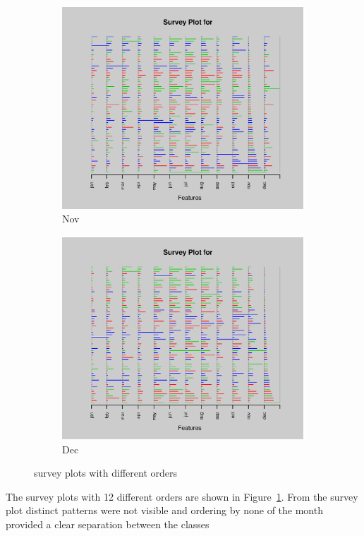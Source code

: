 \documentclass{article}
\begin{document}
\begin{enumerate}[leftmargin = 0 em, label = \arabic*., font = \bfseries]
\begin{enumerate}
\begin{enumerate}
\begin{figure}[!htb]
\begin{subfigure}[b]{0.3\textwidth}
        	\includegraphics[width = \textwidth]{3cii11.eps}
        	\caption{Nov}
        	\end{subfigure}%
        	\begin{subfigure}[b]{0.3\textwidth}
        	\includegraphics[width = \textwidth]{3cii12.eps}
        	\caption{Dec}
        	\end{subfigure}
        	\caption{survey plots with different orders}
        	\label{3bii}
        \end{figure}
        \newpage
        The survey plots with 12 different orders are shown in Figure~\ref{3bii}. From the survey plot distinct patterns were not visible and ordering by none of the month provided a clear separation between the classes

\end{enumerate}
\end{enumerate}
\end{enumerate}
\end{document}
